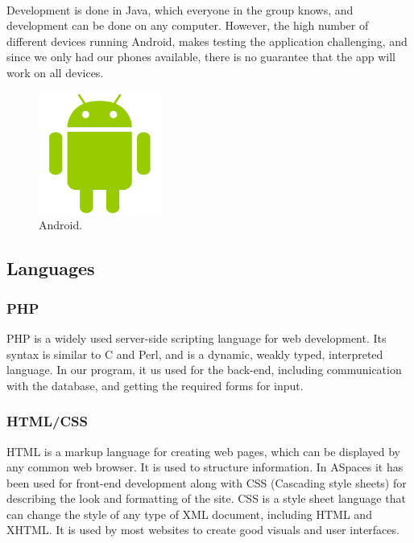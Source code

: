 \paragraph{} Development is done in Java, which everyone in the group knows, and development can be done on any computer. However, the high number of different devices running Android, makes testing the application challenging, and since we only had our phones available, there is no guarantee that the app will work on all devices.

\begin{figure}[ht!]
  \centering
  \includegraphics[width=40mm]{./Planning/img/AndroidLogo}
  \caption{Android.}
  \label{fig:PlanningSoftwareDevAndroid}
\end{figure}


\subsection{Languages}
\label{subsec:PlanningSoftwareDevLanguages}

\subsubsection{PHP} PHP is a widely used server-side scripting language for web development. Its syntax is similar to C and Perl, and is a dynamic, weakly typed, interpreted language. In our program, it us used for the back-end, including communication with the database, and getting the required forms for input.

\subsubsection{HTML/CSS} HTML is a markup language for creating web pages, which can be displayed by any common web browser. It is used to structure information. In ASpaces it has been used for front-end development along with CSS (Cascading style sheets) for describing the look and formatting of the site. CSS is a style sheet language that can change the style of any type of XML document, including HTML and XHTML. It is used by most websites to create good visuals and user interfaces.

